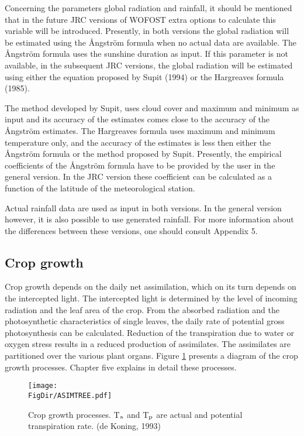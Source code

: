 Concerning the parameters global radiation and rainfall, it should be mentioned that in the
future JRC versions of WOFOST extra options to calculate this variable will be intro\-duced. 
Presently, in both versions the global radiation will be estimated using the \AA ngs\-tr\"{o}m 
formula when no actual data are available. The \AA ngs\-tr\"{o}m formula uses the sunshine
duration as input. If this parame\-ter is not available, in the subsequent JRC versions, the
global radiation will be estimated using either the equation proposed by Supit (1994) or
the Hargre\-aves formula (1985). 

The method developed by Supit, uses cloud cover and
maximum and minimum as input and its accuracy of the estimates comes close to the
accuracy of the \AA ngs\-tr\"{o}m estimates. The Hargreaves formula uses maximum and
minimum temperature only, and the accuracy of the estimates is less then either the 
\AA ngs\-tr\"{o}m formula or the method proposed by Supit.
Presently, the empirical coefficients of the \AA ngs\-tr\"{o}m formula have to be provided by the
user in the general version. In the JRC version these coefficient can be calculated as a
function of the latitude of the meteorological station.

Actual rainfall data are used as input in both versions. In the general version however, it
is also possible to use generated rainfall. For more informa\-tion about the differences
between these versions, one should consult Appendix 5.

\subsection{Crop growth}
Crop growth depends on the daily net assimilation, which on its turn depends on the
intercepted light. The intercepted light is determined by the level of incoming radiation
and the leaf area of the crop. From the absorbed radiation and the photosynthetic
characteristics of single leaves, the daily rate of potential gross photosynthesis can be
calculated. Reduction of the transpiration due to water or oxygen stress results in a
reduced production of assimilates. The assimilates are partitioned over the various plant
organs. Figure \ref{fig:CropGrowthProcesses} presents a diagram of the crop growth processes. 
Chapter five explains in detail these processes.

\begin{figure}[htbp]
\centering
\texttt{[image: \\FigDir/ASIMTREE.pdf]}
\caption{Crop growth pro\-cesses. {\small T$_{{\rm a}}$ and T$_{{\rm p}}$ are actual and 
potential transpiration rate.} (de Koning, 1993)}
\label{fig:CropGrowthProcesses}
\end{figure}

